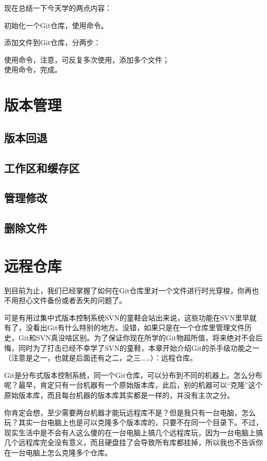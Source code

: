\documentclass[•]{article}
\begin{document}
\begin{CJK}{UTF8}{gbsn}
现在总结一下今天学的两点内容：

初始化一个Git仓库，使用\fbox{\color{red}{git init}}命令。

添加文件到Git仓库，分两步：

    使用命令\fbox{\color{red}{git add <file>}}，注意，可反复多次使用，添加多个文件；\\
    使用命令\fbox{\color{red}{git commit -m <message>}}，完成。
 


\section{版本管理}
\subsection{版本回退}
\subsection{工作区和缓存区}
\subsection{管理修改}
\subsection{删除文件}
\section{远程仓库}
\qquad 到目前为止，我们已经掌握了如何在Git仓库里对一个文件进行时光穿梭，你再也不用担心文件备份或者丢失的问题了。

\qquad 可是有用过集中式版本控制系统SVN的童鞋会站出来说，这些功能在SVN里早就有了，没看出Git有什么特别的地方。没错，如果只是在一个仓库里管理文件历史，Git和SVN真没啥区别。为了保证你现在所学的Git物超所值，将来绝对不会后悔，同时为了打击已经不幸学了SVN的童鞋，本章开始介绍Git的杀手级功能之一（注意是之一，也就是后面还有之二，之三……）：远程仓库。

\qquad Git是分布式版本控制系统，同一个Git仓库，可以分布到不同的机器上。怎么分布呢？最早，肯定只有一台机器有一个原始版本库，此后，别的机器可以“克隆”这个原始版本库，而且每台机器的版本库其实都是一样的，并没有主次之分。

\qquad 你肯定会想，至少需要两台机器才能玩远程库不是？但是我只有一台电脑，怎么玩？其实一台电脑上也是可以克隆多个版本库的，只要不在同一个目录下。不过，现实生活中是不会有人这么傻的在一台电脑上搞几个远程库玩，因为一台电脑上搞几个远程库完全没有意义，而且硬盘挂了会导致所有库都挂掉，所以我也不告诉你在一台电脑上怎么克隆多个仓库。


\end{CJK}
\end{document}
